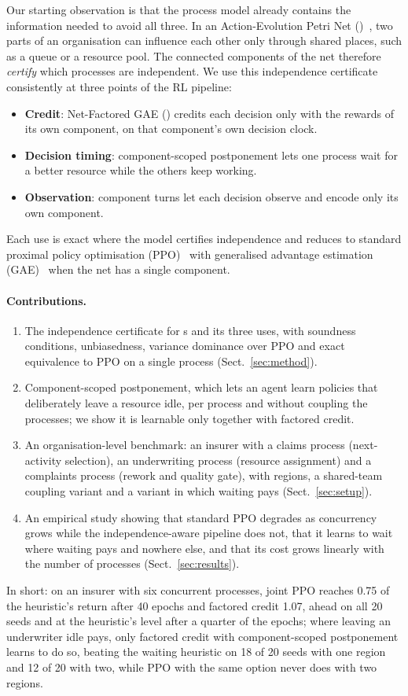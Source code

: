 Our starting observation is that the process model already contains the information
needed to avoid all three. In an Action-Evolution Petri Net (\aepn)~\cite{aepn2023},
two parts of an organisation can influence each other only through shared places,
such as a queue or a resource pool. The connected components of the net therefore
\emph{certify} which processes are independent. We use this independence certificate
consistently at three points of the RL pipeline:
\begin{itemize}
  \item \textbf{Credit}: Net-Factored GAE (\nfgae) credits each decision only with the
    rewards of its own component, on that component's own decision clock.
  \item \textbf{Decision timing}: component-scoped postponement lets one process wait
    for a better resource while the others keep working.
  \item \textbf{Observation}: component turns let each decision observe and encode only
    its own component.
\end{itemize}
Each use is exact where the model certifies independence and reduces to standard
proximal policy optimisation (PPO)~\cite{ppo2017} with generalised advantage
estimation (GAE)~\cite{gae2016} when the net has a single component.

\paragraph{Contributions.}
\begin{enumerate}
  \item The independence certificate for \aepn{}s and its three uses, with soundness
    conditions, unbiasedness, variance dominance over PPO and exact equivalence to PPO
    on a single process (Sect.~\ref{sec:method}).
  \item Component-scoped postponement, which lets an agent learn policies that
    deliberately leave a resource idle, per process and without coupling the processes; we show it is learnable only
    together with factored credit.
  \item An organisation-level benchmark: an insurer with a claims process
    (next-activity selection), an underwriting process (resource assignment) and a
    complaints process (rework and quality gate), with regions, a shared-team coupling
    variant and a variant in which waiting pays (Sect.~\ref{sec:setup}).
  \item An empirical study showing that standard PPO degrades as concurrency grows
    while the independence-aware pipeline does not, that it learns to wait where
    waiting pays and nowhere else, and that its cost grows linearly with the number of
    processes (Sect.~\ref{sec:results}).
\end{enumerate}
In short: on an insurer with six concurrent processes, joint PPO reaches 0.75 of the
heuristic's return after 40 epochs and factored credit 1.07, ahead on all 20 seeds and
at the heuristic's level after a quarter of the epochs; where leaving an underwriter idle
pays, only factored credit with component-scoped postponement learns to do so, beating
the waiting heuristic on 18 of 20 seeds with one region and 12 of 20 with two, while PPO
with the same option never does with two regions.
